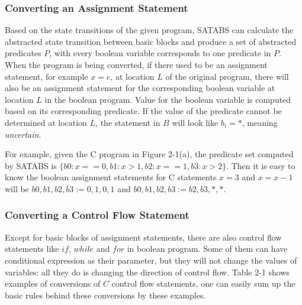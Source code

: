 \subsubsection{Converting an Assignment Statement}
\label{section:ConvertingAnAssignmentStatement}
Based on the state transitions of the given program, SATABS can calculate the abstracted state transition between basic blocks and produce a set of abstracted predicates $P$, with every boolean variable corresponds to one predicate in $P$.
When the program is being converted, if there used to be an assignment statement, for example $x = e$, at location $L$ of the original program, there will also be an assignment statement for the corresponding boolean variable at location $L$ in the boolean program\cite{MLS:STEPaBP}.
Value for the boolean variable is computed based on its corresponding predicate.
If the value of the predicate cannot be determined at location $L$, the statement in $B$ will look like $b_{i} = *$, meaning {\it uncertain}.

For example, given the C program in Figure 2-1(a), the predicate set computed by SATABS is $\{b0 : x == 0, b1 : x > 1, b2 : x == 1, b3 : x > 2\}$. Then it is easy to know the boolean assignment statements for C statements $x = 3$ and $x = x - 1$ will be $b0,b1,b2,b3 := 0,1,0,1$ and $b0,b1,b2,b3 := b2,b3,*,*$.

\subsubsection{Converting a Control Flow Statement}
\label{section:ConvertingAControlFlowStatement}
Except for basic blocks of assignment statements, there are also control flow statements like $if$, $while$ and $for$ in boolean program.
Some of them can have conditional expression as their parameter, but they will not change the values of variables: all they do is changing the direction of control flow.
Table 2-1 shows examples of conversions of $C$ control flow statements, one can easily sum up the basic rules behind these conversions by these examples.

